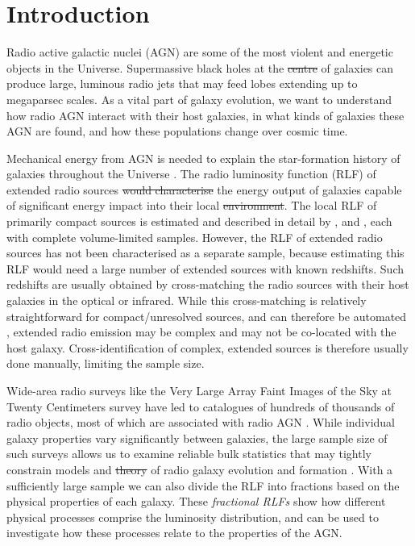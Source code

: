\documentclass[11pt, a4paper]{book}
\newcommand{\defn}[1]{\emph{#1}}
\providecommand{\DIFaddtex}[1]{{\protect\color{blue}\uwave{#1}}} %
\providecommand{\DIFdeltex}[1]{{\protect\color{red}\sout{#1}}}                      %
\providecommand{\DIFaddbegin}{} %
\providecommand{\DIFaddend}{} %
\providecommand{\DIFdelbegin}{} %
\providecommand{\DIFdelend}{} %
\providecommand{\DIFadd}[1]{\texorpdfstring{\DIFaddtex{#1}}{#1}} %
\providecommand{\DIFdel}[1]{\texorpdfstring{\DIFdeltex{#1}}{}} %
\newcommand{\DIFscaledelfig}{0.5}
\newlength{\DIFdelgraphicswidth} %
\newlength{\DIFdelgraphicsheight} %
\newcommand{\DIFaddincludegraphics}[2][]{{\color{blue}\fbox{\DIFOincludegraphics[#1]{#2}}}} %
\newcommand{\DIFdelincludegraphics}[2][]{%
\sbox{\DIFdelgraphicsbox}{\DIFOincludegraphics[#1]{#2}}%
\settoboxwidth{\DIFdelgraphicswidth}{\DIFdelgraphicsbox} %
\settoboxtotalheight{\DIFdelgraphicsheight}{\DIFdelgraphicsbox} %
\scalebox{\DIFscaledelfig}{%
\parbox[b]{\DIFdelgraphicswidth}{\usebox{\DIFdelgraphicsbox}\\[-\baselineskip] \rule{\DIFdelgraphicswidth}{0em}}\llap{\resizebox{\DIFdelgraphicswidth}{\DIFdelgraphicsheight}{%
\setlength{\unitlength}{\DIFdelgraphicswidth}%
\begin{picture}(1,1)%
\thicklines\linethickness{2pt} %
{\color[rgb]{1,0,0}\put(0,0){\framebox(1,1){}}}%
{\color[rgb]{1,0,0}\put(0,0){\line( 1,1){1}}}%
{\color[rgb]{1,0,0}\put(0,1){\line(1,-1){1}}}%
\end{picture}%
}\hspace*{3pt}}} %
} %
\DeclareRobustCommand{\DIFaddbegin}{\DIFOaddbegin \let\includegraphics\DIFaddincludegraphics} %
\DeclareRobustCommand{\DIFaddend}{\DIFOaddend \let\includegraphics\DIFOincludegraphics} %
\DeclareRobustCommand{\DIFdelbegin}{\DIFOdelbegin \let\includegraphics\DIFdelincludegraphics} %
\DeclareRobustCommand{\DIFdelend}{\DIFOaddend \let\includegraphics\DIFOincludegraphics} %
\begin{document}
\section{Introduction} \label{sec:rlfs-intro}

Radio active galactic nuclei (AGN) are some of the most violent and energetic
objects in the Universe. Supermassive black holes at the \DIFdelbegin \DIFdel{centre }\DIFdelend \DIFaddbegin \DIFadd{centres }\DIFaddend of galaxies
can produce large, luminous radio jets that may feed lobes extending up to
megaparsec scales. As a vital part of galaxy evolution, we want to understand
how radio AGN interact with their host galaxies, in what kinds of galaxies
these AGN are found, and how these populations change over cosmic time.

Mechanical energy from AGN is needed to explain the star-formation history of galaxies throughout the Universe \citep[e.g.][]{raouf17agn,hardcastle20feedback}. The radio luminosity function (RLF) of extended radio sources \DIFdelbegin \DIFdel{would characterise }\DIFdelend \DIFaddbegin \DIFadd{characterises }\DIFaddend the energy output of galaxies capable of significant energy impact into their local \DIFdelbegin \DIFdel{environment}\DIFdelend \DIFaddbegin \DIFadd{environments}\DIFaddend . The local RLF of primarily compact sources is estimated and
described in detail by \citet{mauch07rlf}, \citet{pracy16rlf}\DIFaddbegin \DIFadd{, }\DIFaddend and
\citet{condon19rlf}, each with complete volume-limited samples. However, the RLF of extended radio sources has not been
characterised as a separate sample, because estimating this RLF would need a large number of extended sources with known
redshifts. Such redshifts are usually obtained by cross-matching the radio
sources with their host galaxies in the optical or infrared. While this
cross-matching is relatively straightforward for compact/unresolved sources,
and can therefore be automated \citep[e.g.][]{kimball08}, extended radio
emission may be complex and may not be co-located with the host galaxy.
Cross-identification of complex, extended sources is therefore usually done
manually, limiting the sample size.

Wide-area radio surveys like the Very Large Array Faint Images of the Sky at
Twenty Centimeters survey \citep[FIRST;][]{white97first} have led to
catalogues of hundreds of thousands of radio objects, most of which are
associated with radio AGN \citep{sadler02rlf}. While individual galaxy
properties vary significantly between galaxies, the large sample size of
such surveys allows us to examine reliable bulk statistics that may
tightly constrain models and \DIFdelbegin \DIFdel{theory }\DIFdelend \DIFaddbegin \DIFadd{theories }\DIFaddend of radio galaxy evolution and formation \citep{condon92radio}. With a
sufficiently large sample \citep[of size $N$ such that $N \gg
\sqrt{N}$;][]{condon91rlf} we can also divide the RLF into fractions based
on the physical properties of each galaxy. These \defn{fractional RLFs} show
how different physical processes comprise the luminosity distribution, and
can be used to investigate how these processes relate to the properties of
the AGN.
\end{document}
